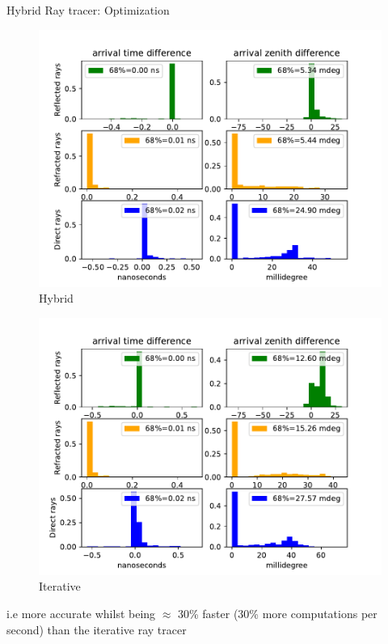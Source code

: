 \documentclass{beamer}
\begin{document}
\begin{frame}{Hybrid Ray tracer: Optimization}
	\begin{minipage}{0.49\textwidth}
	\begin{figure}
		\centering
		\includegraphics[width=\textwidth]{figures/hybrid_comparison_N_500.pdf}
		\caption{Hybrid}
	\end{figure}
	\end{minipage}
	\begin{minipage}{0.49\textwidth}
	\begin{figure}
		\centering
		\includegraphics[width=\textwidth]{figures/iterative_comparison_N_500.pdf}
		\caption{Iterative}
	\end{figure}
	\end{minipage}
i.e more accurate whilst being $\approx$ 30\% faster (30\% more computations per second) than the iterative ray tracer
\end{frame}
\end{document}
